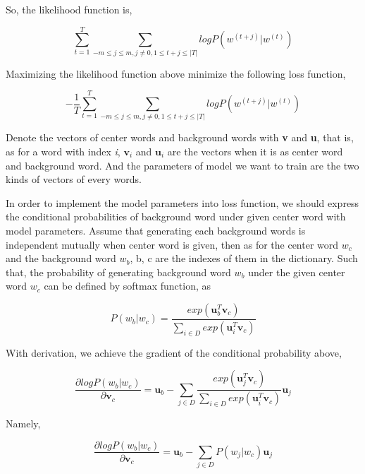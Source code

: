 \documentclass[10pt, conference, compsocconf]{IEEEtran}
\begin{document}
So, the likelihood function is,

\begin{equation}
\sum_{t=1}^{T}\sum_{-m \leq j \leq m, j\neq 0, 1\leq t+j \leq \big|T\big|}log P(w^{(t+j)}\big|w^{(t)})
\end{equation}

Maximizing the likelihood function above minimize the following loss function,

\begin{equation}
-\frac{1}{T} \sum_{t=1}^{T}\sum_{-m \leq j \leq m, j\neq 0, 1\leq t+j \leq \big|T\big|}log P(w^{(t+j)}\big|w^{(t)})
\end{equation}

Denote the vectors of center words and background words with \textbf{v} and \textbf{u}, that is, as for a word with index \textit{i}, $\textbf{v}_{i}$ and $\textbf{u}_{i}$ are the vectors when it is as center word and background word. And the parameters of model we want to train are the two kinds of vectors of every words. 

In order to implement the model parameters into loss function, we should express the conditional probabilities of background word under given center word with model parameters. Assume that generating each background words is independent mutually when center word is given, then as for the center word $w_{c}$ and the background word $w_{b}$, b, c are the indexes of them in the dictionary. Such that, the probability of generating background word $w_{b}$ under the given center word $w_{c}$ can be defined by softmax function, as

\begin{equation}
P(w_{b}\big|w_{c})=\frac{exp(\textbf{u}_{b} ^{T}\textbf{v}_{c})}{\sum_{i\in D}exp(\textbf{u}_{i}^{T}\textbf{v}_{c})}
\end{equation}

With derivation, we achieve the gradient of the conditional probability above,

\begin{equation}
\frac{\partial logP(w_{b}\big|w_{c})}{\partial \textbf{v}_{c}}=\textbf{u}_{b}-\sum_{j\in D}\frac{exp(\textbf{u}_{j} ^{T}\textbf{v}_{c})}{\sum_{i\in D}exp(\textbf{u}_{i}^{T}\textbf{v}_{c})}\textbf{u}_{j}
\end{equation}

Namely,

\begin{equation}
\frac{\partial logP(w_{b}\big|w_{c})}{\partial \textbf{v}_{c}}=\textbf{u}_{b}-\sum_{j\in D}P(w_{j}\big|w_{c})\textbf{u}_{j}
\end{equation}
\end{document}
